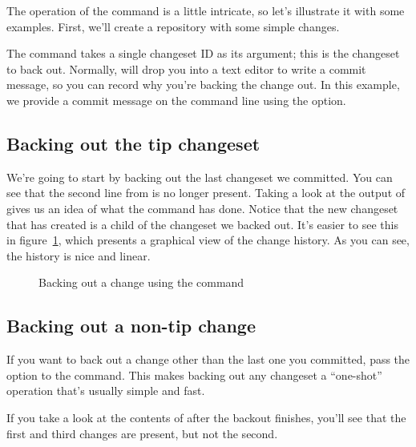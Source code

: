 The operation of the  command is a little intricate, so
let's illustrate it with some examples.  First, we'll create a
repository with some simple changes.

The  command takes a single changeset ID as its
argument; this is the changeset to back out.  Normally,
 will drop you into a text editor to write a commit
message, so you can record why you're backing the change out.  In this
example, we provide a commit message on the command line using the
 option.

\subsection{Backing out the tip changeset}

We're going to start by backing out the last changeset we committed.
You can see that the second line from  is no longer
present.  Taking a look at the output of  gives us an idea
of what the  command has done.
Notice that the new changeset that  has created is a
child of the changeset we backed out.  It's easier to see this in
figure~\ref{fig:undo:backout}, which presents a graphical view of the
change history.  As you can see, the history is nice and linear.

\begin{figure}[htb]
  \centering
  \caption{Backing out a change using the  command}
  \label{fig:undo:backout}
\end{figure}

\subsection{Backing out a non-tip change}

If you want to back out a change other than the last one you
committed, pass the  option to the
 command.
This makes backing out any changeset a ``one-shot'' operation that's
usually simple and fast.

If you take a look at the contents of  after the
backout finishes, you'll see that the first and third changes are
present, but not the second.

